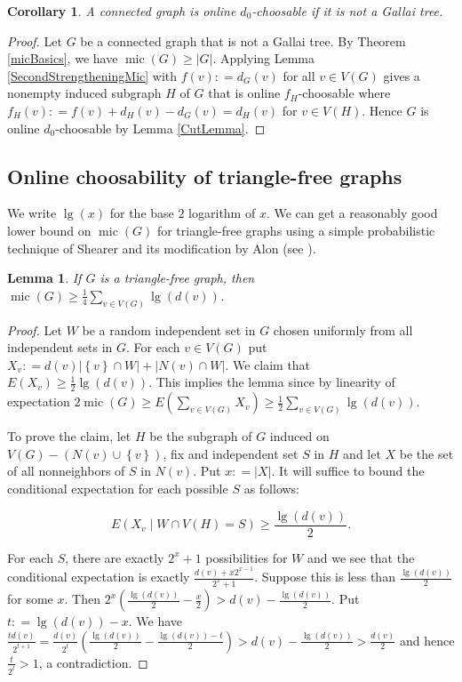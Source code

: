 \documentclass[12pt]{article}
\theoremstyle{plain}
\newtheorem{lem}[thm]{Lemma}
\newtheorem{cor}[thm]{Corollary}
\theoremstyle{definition}
\theoremstyle{remark}
\newcommand{\set}[1]{\left\{ #1 \right\}}
\newcommand{\card}[1]{\left|#1\right|}
\newcommand{\parens}[1]{\left( #1 \right)}
\newcommand{\DefinedAs}{\mathrel{\mathop:}=}
\newcommand{\mic}{\operatorname{mic}}
\begin{document}
\begin{cor}
A connected graph is online $d_0$-choosable if it is not a Gallai tree.
\end{cor}
\begin{proof}
Let $G$ be a connected graph that is not a Gallai tree. By Theorem \ref{micBasics}, we have $\mic(G) \ge |G|$.  Applying Lemma \ref{SecondStrengtheningMic} with $f(v) \DefinedAs d_G(v)$ for all $v \in V(G)$ gives
a nonempty induced subgraph $H$ of $G$ that is online $f_H$-choosable where $f_H(v) \DefinedAs f(v) + d_H(v) - d_G(v) = d_H(v)$ for $v \in V(H)$.  Hence $G$ is online $d_0$-choosable by Lemma \ref{CutLemma}.
\end{proof}


\subsection{Online choosability of triangle-free graphs}
We write $\lg(x)$ for the base $2$ logarithm of $x$.  We can get a reasonably good lower bound on $\mic(G)$ for triangle-free graphs using a simple probabilistic technique of Shearer and its modification by Alon (see \cite{alon2004probabilistic}).
\begin{lem}\label{triangle-free-mic}
If $G$ is a triangle-free graph, then $\mic(G) \ge \frac14 \sum_{v\in V(G)} \lg(d(v))$.
\end{lem}
\begin{proof}
Let $W$ be a random independent set in $G$ chosen uniformly from all independent sets in $G$.  For each $v \in V(G)$ put $X_v \DefinedAs d(v)\card{\set{v} \cap W} + \card{N(v) \cap W}$.
We claim that $E(X_v) \ge \frac12 \lg(d(v))$.  This implies the lemma since by linearity of expectation $2\mic(G) \ge E\parens{\sum_{v \in V(G)} X_v} \ge \frac12 \sum_{v\in V(G)} \lg(d(v))$.

To prove the claim, let $H$ be the subgraph of $G$ induced on $V(G) - \parens{N(v) \cup \set{v}}$, fix and independent set $S$ in $H$ and let $X$ be the set of all nonneighbors of $S$ in $N(v)$.  Put $x \DefinedAs |X|$.  It will suffice to bound the conditional expectation for each possible $S$ as follows:

\[E\parens{X_v \mid W \cap V(H) = S} \ge \frac{\lg(d(v))}{2}.\]

For each $S$, there are exactly $2^x + 1$ possibilities for $W$ and we see that the conditional expectation is exactly $\frac{d(v) + x2^{x-1}}{2^x + 1}$.  Suppose this is less than $\frac{\lg(d(v))}{2}$ for some $x$.
Then $2^x\parens{\frac{\lg(d(v))}{2} - \frac{x}{2}} > d(v) - \frac{\lg(d(v))}{2}$. Put $t \DefinedAs \lg(d(v)) - x$.  We have $\frac{td(v)}{2^{t+1}} = \frac{d(v)}{2^t}\parens{\frac{\lg(d(v))}{2} - \frac{\lg(d(v)) - t}{2}} > d(v) - \frac{\lg(d(v))}{2} > \frac{d(v)}{2}$ and hence $\frac{t}{2^t} > 1$, a contradiction.
\end{proof}
\end{document}
